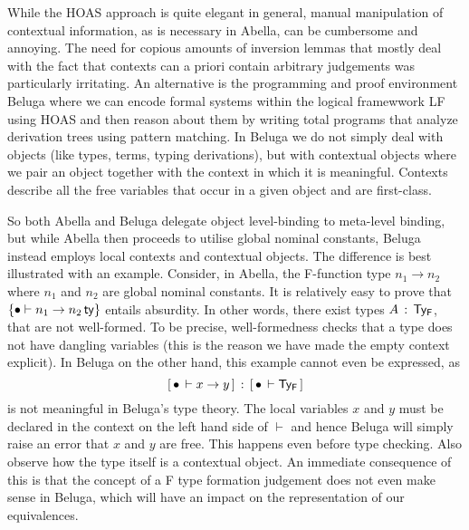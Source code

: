 \newcommand{\tax}{\textsf{t\_ax}}
\newcommand{\tpi}{\textsf{t\_pi}~}
\newcommand{\tlam}{\textsf{t\_lam}~}
\newcommand{\tapp}{\textsf{t\_app}~}
\newcommand{\ptc}{\textsf{p\_tc}}

\newcommand{\rall}{\textsf{r\_all}}
\newcommand{\rarr}{\textsf{r\_arr}}
\newcommand{\rapp}{\textsf{r\_app}}
\newcommand{\rtapp}{\textsf{r\_App}}
\newcommand{\rlam}{\textsf{r\_lam}}
\newcommand{\rtlam}{\textsf{r\_Lam}}

\newcommand{\D}{\mathcal{D}}

While the HOAS approach is quite elegant in general,  manual manipulation of contextual information, as is necessary in Abella, can be cumbersome and annoying. 
The need for copious amounts of inversion lemmas that mostly deal with the fact that contexts can a priori contain arbitrary judgements was particularly irritating.
An alternative is the programming and proof environment Beluga \cite{Pientka:IJCAR10,Pientka:FLOPS10,Pientka:CADE15} where we can encode formal systems within the logical framewwork LF \cite{Harper93jacm} using HOAS and then reason about them by writing total programs that analyze derivation trees using pattern matching. 
In Beluga we do not simply deal with objects (like types, terms, typing derivations), but with contextual objects where we pair an object together with the context in which it is meaningful\cite{Nanevski:ICML05,Pientka:POPL08}.
Contexts describe all the free variables that occur in a given object and are first-class. 

So both Abella and Beluga delegate object level-binding to meta-level binding, but while Abella then proceeds to utilise global nominal constants, Beluga instead employs local contexts and contextual objects. 
The difference is best illustrated with an example.
Consider, in Abella, the F-function type $n_1 \to n_2$ where $n_1$ and $n_2$ are global nominal constants. 
It is relatively easy to prove that $\{\bullet \vdash n_1 \to n_2\,\mathsf{ty}\}$ entails absurdity.
In other words, there exist types $A \mathrel{\, : \,} \mathsf{Ty_{F}}$, that are not well-formed.
To be precise, well-formedness checks that a type does not have dangling variables (this is the reason we have made the empty context explicit).
%
\newcommand{\bc}[2]{\ensuremath{[\,#1\,\vdash #2\,]}}
In Beluga on the other hand, this example cannot even be expressed, as \[\bc{\emptyctx}{x \to y} \OF \bc{\emptyctx}{\TyF}\] is not meaningful in Beluga's type theory. The local variables $x$ and $y$ must be declared in the context on the left hand side of $\vdash$ and hence Beluga will simply raise an error that $x$ and $y$ are free. This happens even before type checking. Also observe how the type itself is a contextual object. An immediate consequence of this is that the concept of a F type formation judgement does not even make sense in Beluga, which will have an impact on the representation of our equivalences.

